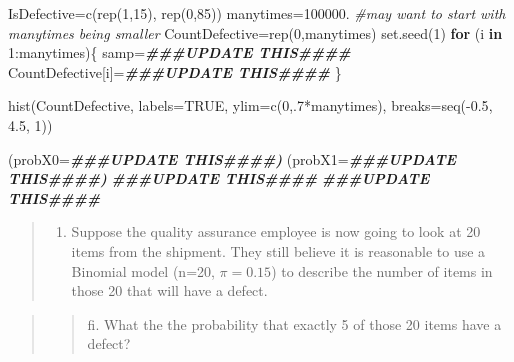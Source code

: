 \documentclass[
]{article}
\newenvironment{Shaded}{\begin{snugshade}}{\end{snugshade}}
\newcommand{\AttributeTok}[1]{\textcolor[rgb]{0.77,0.63,0.00}{#1}}
\newcommand{\CommentTok}[1]{\textcolor[rgb]{0.56,0.35,0.01}{\textit{#1}}}
\newcommand{\ConstantTok}[1]{\textcolor[rgb]{0.00,0.00,0.00}{#1}}
\newcommand{\ControlFlowTok}[1]{\textcolor[rgb]{0.13,0.29,0.53}{\textbf{#1}}}
\newcommand{\DecValTok}[1]{\textcolor[rgb]{0.00,0.00,0.81}{#1}}
\newcommand{\DocumentationTok}[1]{\textcolor[rgb]{0.56,0.35,0.01}{\textbf{\textit{#1}}}}
\newcommand{\FloatTok}[1]{\textcolor[rgb]{0.00,0.00,0.81}{#1}}
\newcommand{\FunctionTok}[1]{\textcolor[rgb]{0.00,0.00,0.00}{#1}}
\newcommand{\NormalTok}[1]{#1}
\newcommand{\OtherTok}[1]{\textcolor[rgb]{0.56,0.35,0.01}{#1}}
\newcommand{\SpecialCharTok}[1]{\textcolor[rgb]{0.00,0.00,0.00}{#1}}
\providecommand{\tightlist}{%
  \setlength{\itemsep}{0pt}\setlength{\parskip}{0pt}}
\begin{document}
\begin{Shaded}
\begin{Highlighting}[]
\NormalTok{IsDefective}\OtherTok{=}\FunctionTok{c}\NormalTok{(}\FunctionTok{rep}\NormalTok{(}\DecValTok{1}\NormalTok{,}\DecValTok{15}\NormalTok{), }\FunctionTok{rep}\NormalTok{(}\DecValTok{0}\NormalTok{,}\DecValTok{85}\NormalTok{))}
\NormalTok{manytimes}\OtherTok{=}\FloatTok{100000.} \CommentTok{\#may want to start with manytimes being smaller}
\NormalTok{CountDefective}\OtherTok{=}\FunctionTok{rep}\NormalTok{(}\DecValTok{0}\NormalTok{,manytimes)}
\FunctionTok{set.seed}\NormalTok{(}\DecValTok{1}\NormalTok{)}
\ControlFlowTok{for}\NormalTok{ (i }\ControlFlowTok{in} \DecValTok{1}\SpecialCharTok{:}\NormalTok{manytimes)\{}
\NormalTok{  samp}\OtherTok{=}\DocumentationTok{\#\#\#UPDATE THIS\#\#\#\#}
\NormalTok{  CountDefective[i]}\OtherTok{=}\DocumentationTok{\#\#\#UPDATE THIS\#\#\#\#}
\NormalTok{\}}

\FunctionTok{hist}\NormalTok{(CountDefective, }\AttributeTok{labels=}\ConstantTok{TRUE}\NormalTok{,}
     \AttributeTok{ylim=}\FunctionTok{c}\NormalTok{(}\DecValTok{0}\NormalTok{,.}\DecValTok{7}\SpecialCharTok{*}\NormalTok{manytimes), }\AttributeTok{breaks=}\FunctionTok{seq}\NormalTok{(}\SpecialCharTok{{-}}\FloatTok{0.5}\NormalTok{, }\FloatTok{4.5}\NormalTok{, }\DecValTok{1}\NormalTok{))}

\NormalTok{(}\AttributeTok{probX0=}\DocumentationTok{\#\#\#UPDATE THIS\#\#\#\#)}
\NormalTok{(}\AttributeTok{probX1=}\DocumentationTok{\#\#\#UPDATE THIS\#\#\#\#)}
\DocumentationTok{\#\#\#UPDATE THIS\#\#\#\#}
\DocumentationTok{\#\#\#UPDATE THIS\#\#\#\#}
\end{Highlighting}
\end{Shaded}

\begin{quote}
\begin{enumerate}
\def\labelenumi{\alph{enumi}.}
\setcounter{enumi}{5}
\tightlist
\item
  Suppose the quality assurance employee is now going to look at 20
  items from the shipment. They still believe it is reasonable to use a
  Binomial model (n=20, \(\pi=0.15\)) to describe the number of items in
  those 20 that will have a defect.
\end{enumerate}
\end{quote}

\begin{quote}
\begin{quote}
fi. What the the probability that exactly 5 of those 20 items have a
defect?
\end{quote}
\end{quote}
\end{document}

